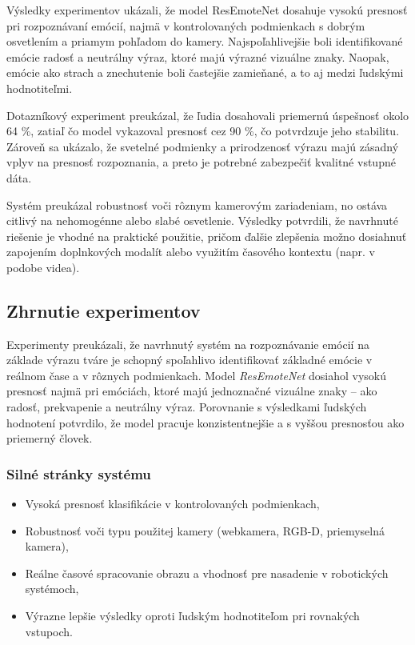 Výsledky experimentov ukázali, že model ResEmoteNet dosahuje vysokú presnosť pri rozpoznávaní emócií, najmä v kontrolovaných podmienkach s dobrým osvetlením a priamym pohľadom do kamery. Najspoľahlivejšie boli identifikované emócie radosť a neutrálny výraz, ktoré majú výrazné vizuálne znaky. Naopak, emócie ako strach a znechutenie boli častejšie zamieňané, a to aj medzi ľudskými hodnotiteľmi.

Dotazníkový experiment preukázal, že ľudia dosahovali priemernú úspešnosť okolo 64 \%, zatiaľ čo model vykazoval presnosť cez 90 \%, čo potvrdzuje jeho stabilitu. Zároveň sa ukázalo, že svetelné podmienky a prirodzenosť výrazu majú zásadný vplyv na presnosť rozpoznania, a preto je potrebné zabezpečiť kvalitné vstupné dáta.

Systém preukázal robustnosť voči rôznym kamerovým zariadeniam, no ostáva citlivý na nehomogénne alebo slabé osvetlenie. Výsledky potvrdili, že navrhnuté riešenie je vhodné na praktické použitie, pričom ďalšie zlepšenia možno dosiahnuť zapojením doplnkových modalít alebo využitím časového kontextu (napr. v podobe videa).

\subsection{Zhrnutie experimentov}

Experimenty preukázali, že navrhnutý systém na rozpoznávanie emócií na základe výrazu tváre je schopný spoľahlivo identifikovať základné emócie v reálnom čase a v rôznych podmienkach. Model \textit{ResEmoteNet} dosiahol vysokú presnosť najmä pri emóciách, ktoré majú jednoznačné vizuálne znaky – ako radosť, prekvapenie a neutrálny výraz. Porovnanie s výsledkami ľudských hodnotení potvrdilo, že model pracuje konzistentnejšie a s vyššou presnosťou ako priemerný človek.

\subsubsection{Silné stránky systému}
\begin{itemize}
  \item Vysoká presnosť klasifikácie v kontrolovaných podmienkach,
  \item Robustnosť voči typu použitej kamery (webkamera, RGB-D, priemyselná kamera),
  \item Reálne časové spracovanie obrazu a vhodnosť pre nasadenie v robotických systémoch,
  \item Výrazne lepšie výsledky oproti ľudským hodnotiteľom pri rovnakých vstupoch.
\end{itemize}

